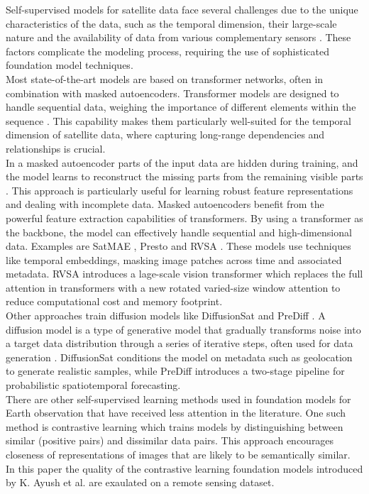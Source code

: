 Self-supervised models for satellite data face several challenges due to the unique characteristics of the data, such as the temporal dimension, their large-scale nature and the availability of data from various complementary sensors \cite{presto}. These factors complicate the modeling process, requiring the use of sophisticated foundation model techniques. \\
Most state-of-the-art models are based on transformer networks, often in combination with masked autoencoders. Transformer models are designed to handle sequential data, weighing the importance of different elements within the sequence \cite{transformer}. This capability makes them particularly well-suited for the temporal dimension of satellite data, where capturing long-range dependencies and relationships is crucial. \\
In a masked autoencoder parts of the input data are hidden during training, and the model learns to reconstruct the missing parts from the remaining visible parts \cite{maskedAutoEncoder}. This approach is particularly useful for learning robust feature representations and dealing with incomplete data. Masked autoencoders benefit from the powerful feature extraction capabilities of transformers. By using a transformer as the backbone, the model can effectively handle sequential and high-dimensional data. Examples are SatMAE \cite{SatMAE}, Presto \cite{presto} and RVSA \cite{rvsa}. These models use techniques like temporal embeddings, masking image patches across time and associated metadata. RVSA introduces a lage-scale vision transformer which replaces the full attention in transformers with a new rotated varied-size window attention to reduce computational cost and memory footprint. \\
Other approaches train diffusion models like DiffusionSat \cite{DiffSat} and PreDiff  \cite{prediff}. A diffusion model is a type of generative model that gradually transforms noise into a target data distribution through a series of iterative steps, often used for data generation \cite{diffusion}. DiffusionSat conditions the model on metadata such as geolocation to generate realistic samples, while PreDiff introduces a two-stage pipeline for probabilistic spatiotemporal forecasting. \\
There are other self-supervised learning methods used in foundation models for Earth observation that have received less attention in the literature. One such method is contrastive learning which trains models by distinguishing between similar (positive pairs) and dissimilar data pairs. This approach encourages closeness of representations of images that are likely to be semantically similar. \cite{geoAwareSelfSuper} \\
In this paper the quality of the contrastive learning foundation models introduced by K. Ayush et al. \cite{geoAwareSelfSuper} are exaulated on a remote sensing dataset.

